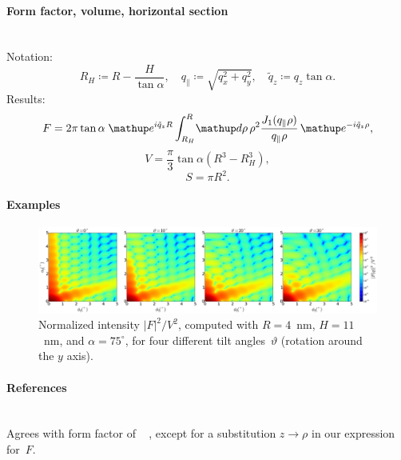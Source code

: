 \paragraph{Form factor, volume, horizontal section}\strut\\
Notation:
\begin{equation*}
  R_H \coloneqq R-\dfrac{H}{\tan \alpha}, \quad
  q_{\parallel} \coloneqq \sqrt{q_x^2+ q_y^2}, \quad
  \tilde{q}_z \coloneqq q_z \tan\alpha.
\end{equation*}
Results:
\begin{equation*}
  F = 2\pi \tan\alpha\; \e^{i\tilde{q}_z R}
      \int_{R_H}^R \!\d\rho\, \rho^2
        \frac{J_1(q_{\parallel}\rho)}{q_{\parallel}\rho}\,\e^{-i\tilde{q}_z \rho},
\end{equation*}
\begin{equation*}
  V = \dfrac{\pi}{3}\tan\alpha  \left( R^3 - R_H^3\right),
\end{equation*}
\begin{equation*}
  S=\pi R^2.
\end{equation*}

\paragraph{Examples}\strut

\begin{figure}[H]
\begin{center}
\includegraphics[width=\textwidth]{fig/ff2/ff_Cone.pdf}
\end{center}
\caption{Normalized intensity $|F|^2/V^2$,
computed with $R=4$~nm, $H=11$~nm, and $\alpha=75^\circ$,
for four different tilt angles~$\vartheta$ (rotation around the $y$ axis).}
\end{figure}

\paragraph{References}\strut\\
Agrees with  form factor of \IsGISAXS\
\cite[Eq.~2.28]{Laz08} \cite[Eq.~225]{ReLL09},
except for a substitution $z\to\rho$ in our expression for~$F$.



